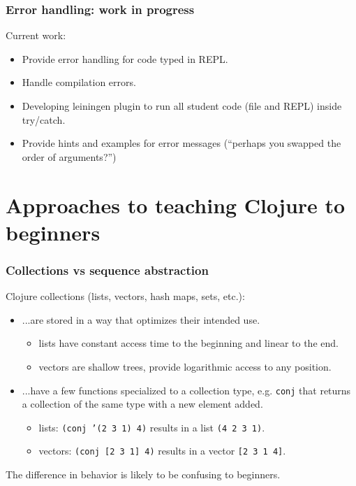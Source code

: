\documentclass{beamer}
\begin{document}
\begin{frame}
\frametitle{Error handling: work in progress}
Current work:
\begin{itemize}
\item Provide error handling for code typed in REPL.
\item Handle compilation errors. 
\item Developing leiningen plugin to run all student code (file and REPL) inside try/catch. 
\item Provide hints and examples for error messages (``perhaps you swapped the order of arguments?'')
\end{itemize}
\end{frame}

\section{Approaches to teaching Clojure to beginners}

\begin{frame}
\frametitle{Collections vs sequence abstraction}
Clojure collections (lists, vectors, hash maps, sets, etc.): 
\begin{itemize}
\item ...are stored in a way that optimizes their intended use. 
\begin{itemize}
\item lists have constant access time to the beginning and linear to the end. 
\item vectors are shallow trees, provide logarithmic access to any position.
\end{itemize}
\item ...have a few functions specialized to a collection type, e.g. {\tt conj} that returns a collection of the same type with a new element added. 
\begin{itemize}
\item lists: {\tt (conj '(2 3 1) 4)} results in a list {\tt (4 2 3 1)}.
\item vectors: {\tt (conj [2 3 1] 4)} results in a vector {\tt [2 3 1 4]}.
\end{itemize}
\end{itemize}
The difference in behavior is likely to be confusing to beginners. 
\end{frame}
\end{document}
